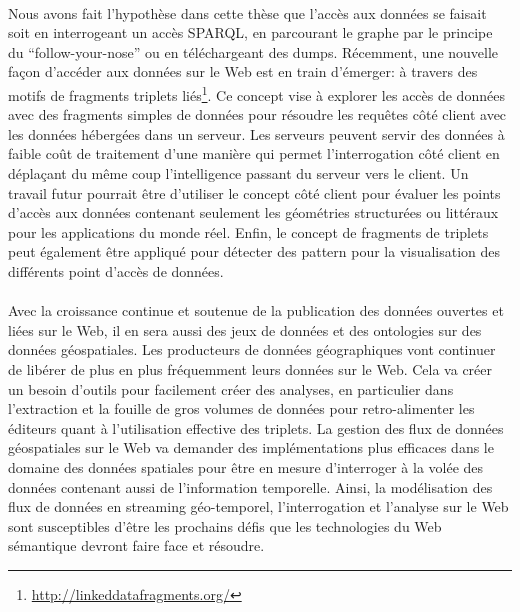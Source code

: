 \documentclass[a4paper,11pt,twoside]{report}
\begin{document}
\paragraph{}
Nous avons fait l'hypothèse dans cette thèse que l'accès aux données se faisait soit en interrogeant un accès SPARQL, en parcourant le graphe par le principe du ``follow-your-nose'' ou en téléchargeant des dumps. Récemment, une nouvelle façon d'accéder aux données sur le Web est en train d'émerger: à travers  des motifs de fragments triplets liés\footnote{\url{http://linkeddatafragments.org/}}. Ce concept vise à explorer les accès de données avec des fragments simples de données pour résoudre les requêtes côté client avec les données hébergées dans un serveur. Les serveurs peuvent servir des données à faible coût de traitement d'une manière qui permet l'interrogation côté client en déplaçant du même coup l'intelligence passant du serveur vers le client. Un travail futur pourrait être d'utiliser le concept côté client pour évaluer les points d'accès aux données contenant seulement les géométries structurées ou littéraux pour les applications du monde réel. Enfin, le concept de fragments de triplets  peut également être appliqué pour détecter des pattern pour la visualisation des différents point d'accès de données.

 
 



\paragraph{}
 
Avec la croissance continue et soutenue de la publication des données ouvertes et liées sur le Web, il en sera aussi des jeux de données et des ontologies sur des données géospatiales. Les producteurs de données  géographiques vont continuer de libérer de plus en plus fréquemment leurs données sur le Web. Cela va créer un besoin d'outils pour facilement créer des analyses, en particulier dans l'extraction et la fouille de gros volumes de données pour retro-alimenter les éditeurs quant à l'utilisation effective des triplets. La gestion des flux de données géospatiales sur le Web va demander des implémentations plus efficaces dans le domaine des données spatiales pour être en mesure d'interroger à la volée des données contenant aussi de l'information temporelle. Ainsi, la modélisation des flux de données en streaming géo-temporel, l'interrogation et l'analyse sur le Web sont susceptibles d'être les prochains défis que les technologies du Web sémantique devront faire face et résoudre.
\end{document}
